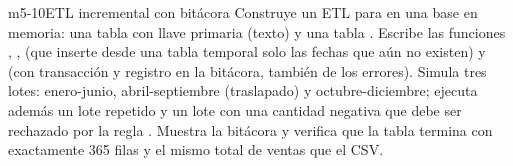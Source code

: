\begin{ejercicio}{m5-10}{ETL incremental con bitácora}
Construye un ETL para  en una base en memoria:
una tabla  con llave primaria 
(texto) y una tabla . Escribe las funciones
, ,
 (que inserte desde una tabla temporal solo las
fechas que aún no existen) y  (con transacción y registro en la
bitácora, también de los errores). Simula tres lotes: enero-junio,
abril-septiembre (traslapado) y octubre-diciembre; ejecuta además un lote
repetido y un lote con una cantidad negativa que debe ser rechazado por la
regla . Muestra la bitácora y verifica que la tabla termina
con exactamente 365 filas y el mismo total de ventas que el CSV.
\end{ejercicio}
